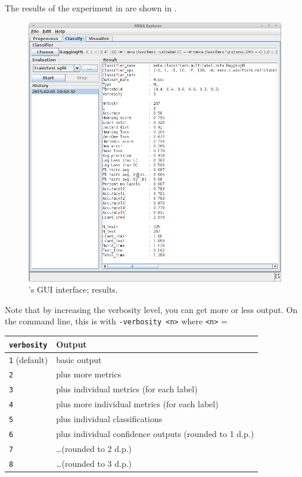 \documentclass[11pt]{article}
\begin{document}
The results of the experiment in  are shown in .
\begin{figure}
	\centering
	\includegraphics[height=0.95\textwidth]{GUI04.png}
	\caption{\label{screen:result} 's GUI interface; results.}
\end{figure}

Note that by increasing the verbosity level, you can get more or less output. On the command line, this is with \texttt{-verbosity <n>} where \texttt{<n>} = 
\begin{center}
\begin{tabular}{ll}
	\hline
	\texttt{verbosity}       & Output \\
	\hline
	\texttt{1} (default) & basic output \\
	 \texttt{2}           & plus more metrics \\
	  \texttt{3}           & plus individual metrics (for each label) \\
	   \texttt{4}           & plus more individual metrics (for each label) \\
		\texttt{5}           & plus individual classifications \\
	  \texttt{6}           & plus individual confidence outputs (rounded to 1 d.p.) \\
	   \texttt{7}           & \ldots (rounded to 2 d.p.) \\
		\texttt{8}           & \ldots (rounded to 3 d.p.) \\
	\hline
\end{tabular}
\end{center}
\end{document}
